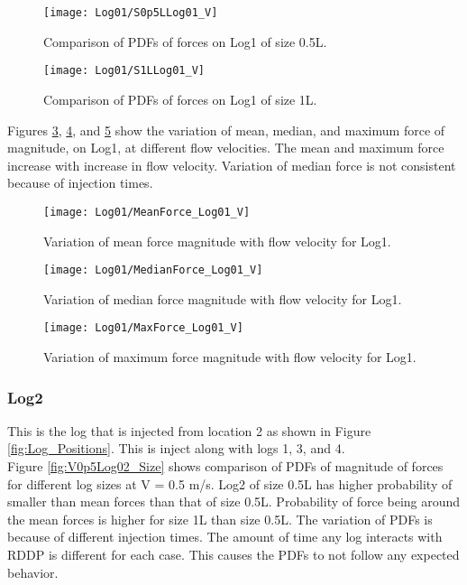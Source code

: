 \begin{figure}
\centering
\texttt{[image: Log01/S0p5LLog01\_V]}
\caption{\label{fig:S0p5LLog01_V}Comparison of PDFs of forces on Log1 of size 0.5L.}
\end{figure}
\begin{figure}
\centering
\texttt{[image: Log01/S1LLog01\_V]}
\caption{\label{fig:S1LLog01_V}Comparison of PDFs of forces on Log1 of size 1L.}
\end{figure}

\noindent Figures \ref{fig:MeanForce_Log01_V}, \ref{fig:MedianForce_Log01_V}, and \ref{fig:MaxForce_Log01_V} show the variation of mean, median, and maximum force of magnitude, on Log1, at different flow velocities. The mean and maximum force increase with increase in flow velocity. Variation of median force is not consistent because of injection times. %


\begin{figure}
\centering
\texttt{[image: Log01/MeanForce\_Log01\_V]}
\caption{\label{fig:MeanForce_Log01_V}Variation of mean force magnitude with flow velocity for Log1.}
\end{figure}
\begin{figure}
\centering
\texttt{[image: Log01/MedianForce\_Log01\_V]}
\caption{\label{fig:MedianForce_Log01_V}Variation of median force magnitude with flow velocity for Log1.}
\end{figure}
\begin{figure}
\centering
\texttt{[image: Log01/MaxForce\_Log01\_V]}
\caption{\label{fig:MaxForce_Log01_V}Variation of maximum force magnitude with flow velocity for Log1.}
\end{figure}
\FloatBarrier
\subsubsection{Log2}
This is the log that is injected from location 2 as shown in Figure \ref{fig:Log_Positions}. This is inject along with logs 1, 3, and 4.\\ 
Figure \ref{fig:V0p5Log02_Size} shows comparison of PDFs of magnitude of forces for different log sizes at V = 0.5 m/s. Log2 of size 0.5L has higher probability of smaller  than mean forces than that of size 0.5L.  Probability of force being around the mean forces is higher for size 1L than size 0.5L. The variation of PDFs is because of different injection times. The amount of time any log interacts with RDDP is different for each case. This causes the PDFs to not follow any expected behavior.

